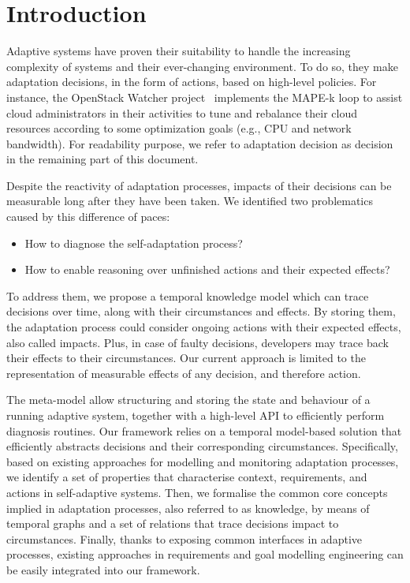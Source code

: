 \section{Introduction}

Adaptive systems have proven their suitability to handle the increasing complexity of systems and their ever-changing environment.
To do so, they make adaptation decisions, in the form of actions, based on high-level policies. 
For instance, the OpenStack Watcher project~\cite{OpenStack:Watcher:Wiki} implements the MAPE-k loop to assist cloud administrators in their activities to tune and rebalance their cloud resources according to some optimization goals (e.g., CPU and network bandwidth). 
For readability purpose, we refer to adaptation decision as decision in the remaining part of this document.

Despite the reactivity of adaptation processes, impacts of their decisions can be measurable long after they have been taken.
We identified two problematics caused by this difference of paces:
\begin{itemize}
	\item How to diagnose the self-adaptation process?
	\item How to enable reasoning over unfinished actions and their expected effects?
\end{itemize}

To address them, we propose a temporal knowledge model which can trace decisions over time, along with their circumstances and effects.
By storing them, the adaptation process could consider ongoing actions with their expected effects, also called impacts.
Plus, in case of faulty decisions, developers may trace back their effects to their circumstances.
Our current approach is limited to the representation of measurable effects of any decision, and therefore action.

The meta-model allow structuring and storing the state and behaviour of a running adaptive system, together with a high-level API to efficiently perform diagnosis routines. 
Our framework relies on a temporal model-based solution that efficiently abstracts decisions and their corresponding circumstances.
Specifically, based on existing approaches for modelling and monitoring adaptation processes, we identify a set of properties that characterise context, requirements, and actions in self-adaptive systems.    
Then, we formalise the common core concepts implied in adaptation processes, also referred to as knowledge, by means of temporal graphs and a set of relations that trace decisions impact to circumstances.
Finally, thanks to exposing common interfaces in adaptive processes, existing approaches in requirements and goal modelling engineering can be easily integrated into our framework. 

